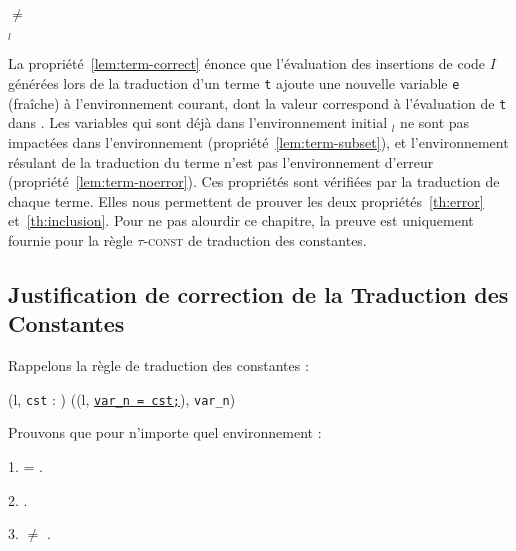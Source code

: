 \begin{myproperty}
  \label{lem:term-noerror}
  \env $\neq$ \errorenv
\end{myproperty}

\begin{myproperty}
  \label{lem:term-subset}
  \env$_l$ \subenv{} \env
\end{myproperty}

La propriété~\ref{lem:term-correct} énonce que l'évaluation des insertions de
code
$I$ générées lors de la traduction d'un terme \lstinline't' ajoute une nouvelle
variable \lstinline'e' (fraîche) à l'environnement courant, dont la valeur
correspond à l'évaluation de \lstinline't' dans \env.
Les variables qui sont déjà dans l'environnement initial \env$_l$ ne sont pas
impactées dans l'environnement \env{} (propriété~\ref{lem:term-subset}), et
l'environnement résulant de la traduction du terme n'est pas l'environnement
d'erreur \errorenv (propriété~\ref{lem:term-noerror}).
Ces propriétés sont vérifiées par la traduction de chaque terme.
Elles nous permettent de prouver les deux propriétés~\ref{th:error}
et~\ref{th:inclusion}.
Pour ne pas alourdir ce chapitre, la preuve est uniquement fournie pour la règle
\textsc{$\tau$-const} de traduction des constantes.


\subsection{Justification de correction de la Traduction des Constantes}

Rappelons la règle de traduction des constantes :

{
  { (l, \mbox{\lstinline'cst'} : ) 
    ((l, \Zinit\underline{\mbox{\lstinline'var_n = cst;'}}),
    \mbox{\lstinline'var_n'}) }
}

Prouvons que pour n'importe quel environnement \env{} :

1.  =
.


2. \env{} \subenv{} .


3.  $\neq$ \errorenv.


